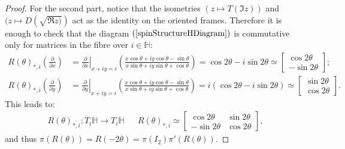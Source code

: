 \documentclass[12pt]{amsart}
\theoremstyle{definition}
\def\HH{{\mathbb{H}}}
\begin{document}
\begin{proof}
For the second part, notice that the isometries $(z\mapsto T(\Im z))$ and $(z\mapsto D(\sqrt{\Re z)})$ act as the identity on the oriented frames. Therefore it is enough to check that the diagram $(\ref{spinStructureHDiagram})$ is commutative only for matrices in the fibre over $i\in \HH$:
\begin{align*}
R(\theta)_{*,i}\left( \frac{\partial}{\partial x} \right)
&=
\left. \frac{\partial}{\partial x} \right|_{x+iy=i} \left( \frac{x\cos \theta + iy\cos \theta - \sin \theta}{x\sin \theta + iy\sin \theta + \cos \theta} \right) = \cos 2\theta - i \sin 2\theta
\simeq 
\begin{bmatrix}
\cos 2\theta \\
-\sin 2\theta
\end{bmatrix}
;\\
R(\theta)_{*,i}\left( \frac{\partial}{\partial y} \right)
&=
\left. \frac{\partial}{\partial y} \right|_{x+iy=i} \left( \frac{x\cos \theta + iy\cos \theta - \sin \theta}{x\sin \theta + iy\sin \theta + \cos \theta} \right) = i(\cos 2\theta - i \sin 2\theta)
\simeq 
\begin{bmatrix}
\sin 2\theta \\
\cos 2\theta
\end{bmatrix}
.
\end{align*}
This leads to:
\begin{align*}
R(\theta)_{*,i}:T_i\HH \longrightarrow T_i\HH
&&
R(\theta)_{*,i}\simeq
\begin{bmatrix}
\cos 2\theta & \sin 2\theta \\
-\sin 2\theta & \cos 2\theta
\end{bmatrix},
\end{align*}
and thus $\pi(R(\theta))=R(-2\theta)=\pi(I_2)\pi'(R(\theta))$.
\end{proof}
\end{document}
